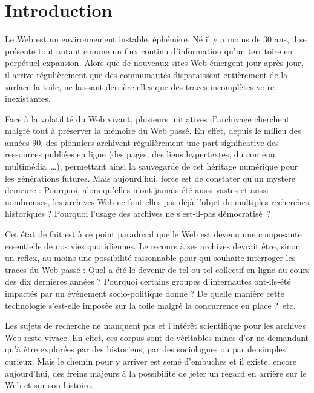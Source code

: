 \documentclass[symmetric,justified,marginals=raggedouter]{tufte-book}
\begin{document}

\tableofcontents




\mainmatter

\chapter*{Introduction}

\noindent Le Web est un environnement instable, éphémère. Né il y a moins de 30 ans, il se présente tout autant comme un flux continu d'information qu'un territoire en perpétuel expansion. Alors que de nouveaux sites Web émergent jour après jour, il arrive régulièrement que des communautés disparaissent entièrement de la surface la toile, ne laissant derrière elles que des traces incomplètes voire inexistantes.

Face à la volatilité du Web vivant, plusieurs initiatives d'archivage cherchent malgré tout à préserver la mémoire du Web passé. En effet, depuis le milieu des années 90, des pionniers archivent régulièrement une part significative des ressources publiées en ligne (des pages, des liens hypertextes, du contenu multimédia~\ldots{}), permettant ainsi la sauvegarde de cet héritage numérique pour les générations futures. Mais aujourd'hui, force est de constater qu'un mystère demeure : Pourquoi, alors qu'elles n'ont jamais été aussi vastes et aussi nombreuses, les archives Web ne font-elles pas déjà l'objet de multiples recherches historiques ? Pourquoi l'usage des archives ne s'est-il-pas démocratisé~?

Cet état de fait est à ce point paradoxal que le Web est devenu une composante essentielle de nos vies quotidiennes. Le recours à ses archives devrait être, sinon un reflex, au moins une possibilité raisonnable pour qui souhaite interroger les traces du Web passé : Quel a été le devenir de tel ou tel collectif en ligne au cours des dix dernières années ? Pourquoi certains groupes d'internautes ont-ils-été impactés par un événement socio-politique donné ? De quelle manière cette technologie s'est-elle imposée sur la toile malgré la concurrence en place ?~etc. 

Les sujets de recherche ne manquent pas et l'intérêt scientifique pour les archives Web reste vivace. En effet, ces corpus sont de véritables mines d'or ne demandant qu'à être explorées par des historiens, par des sociologues ou par de simples curieux. Mais le chemin pour y arriver est semé d'embuches et il existe, encore aujourd'hui, des freins majeurs à la possibilité de jeter un regard en arrière sur le Web et sur son histoire.\\
\end{document}
